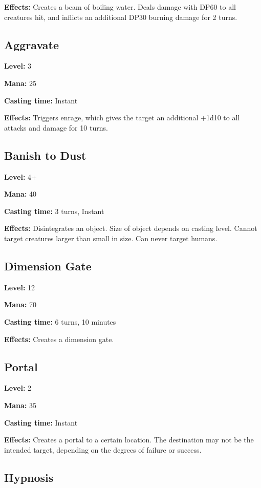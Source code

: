 \documentclass[]{article}
\begin{document}
\textbf{Effects:} Creates a beam of boiling water. Deals damage with
DP60 to all creatures hit, and inflicts an additional DP30 burning
damage for 2 turns.

\subsection{Aggravate}\label{aggravate}

\textbf{Level:} 3

\textbf{Mana:} 25

\textbf{Casting time:} Instant

\textbf{Effects:} Triggers enrage, which gives the target an additional
+1d10 to all attacks and damage for 10 turns.

\subsection{Banish to Dust}\label{banish-to-dust}

\textbf{Level:} 4+

\textbf{Mana:} 40

\textbf{Casting time:} 3 turns, Instant

\textbf{Effects:} Disintegrates an object. Size of object depends on
casting level. Cannot target creatures larger than small in size. Can
never target humans.

\subsection{Dimension Gate}\label{dimension-gate}

\textbf{Level:} 12

\textbf{Mana:} 70

\textbf{Casting time:} 6 turns, 10 minutes

\textbf{Effects:} Creates a dimension gate.

\subsection{Portal}\label{portal}

\textbf{Level:} 2

\textbf{Mana:} 35

\textbf{Casting time:} Instant

\textbf{Effects:} Creates a portal to a certain location. The
destination may not be the intended target, depending on the degrees of
failure or success.

\subsection{Hypnosis}\label{hypnosis}
\end{document}
